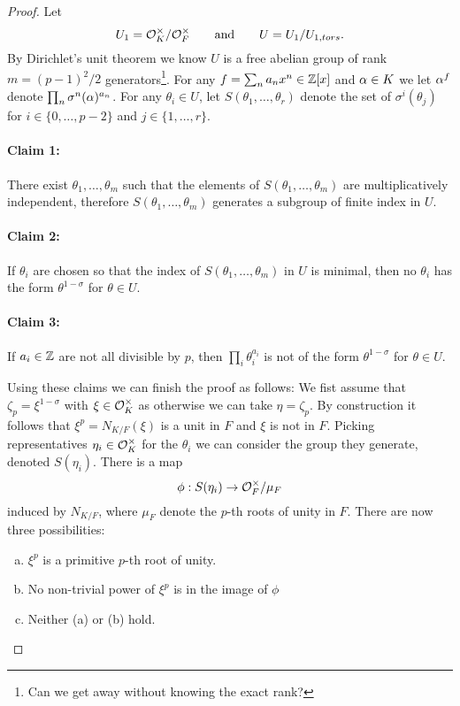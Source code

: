 \begin{proof}
	Let \[U_1= \mathcal{O}_K^\times / \mathcal{O}_F^\times \qquad \text{and} \qquad U=U_1/U_{1,tors}.\] By Dirichlet's unit theorem we know $U$ is a free abelian group of rank $m=(p-1)^2/2$ generators\footnote{ Can we get away without knowing the exact rank?}. For any $f =\sum_n a_n x^n \in \mathbb{Z}[x]$  and $\alpha \in K$ we let $\alpha^f$ denote $\prod_n \sigma^n(\alpha)^{a_n}$. For any $\theta_i \in U$, let $S(\theta_1, \dots,\theta_r)$ denote the set of $\sigma^i(\theta_j)$ for $i \in \{0,\dots,p-2\}$ and $j \in \{1,\dots,r\}$.
	
	\paragraph{\textbf{Claim 1:}} There exist $\theta_1,\dots,\theta_m$ such that  the elements of $S(\theta_1, \dots,\theta_m)$ are multiplicatively independent, therefore $S(\theta_1, \dots,\theta_m)$ generates a subgroup of finite index in $U$.
	
		
	\paragraph{\textbf{Claim 2:}} If $\theta_i$ are chosen so that the index of $S(\theta_1, \dots,\theta_m)$ in $U$ is minimal, then no $\theta_i$ has the form $\theta^{1-\sigma}$ for $\theta \in U$.
	
	
		\paragraph{\textbf{Claim 3:}} If $a_i \in \mathbb{Z}$ are not all divisible by $p$, then $\prod_i \theta_i^{a_i}$ is not of the form $\theta^{1-\sigma}$ for $\theta \in U$.
		
	Using these claims we can finish the proof as follows: We fist assume that $\zeta_p= \xi^{1-\sigma}$ with $\xi \in \mathcal{O}_K^\times$ as otherwise we can take $\eta=\zeta_p$. By construction it follows that $\xi^p=N_{K/F}(\xi)$ is a unit in $F$ and $\xi$ is not in $F$. Picking representatives $\eta_i \in \mathcal{O}_K^\times$ for the $\theta_i$ we can consider the group they generate, denoted $S(\eta_i)$. There is a map \[\phi: S(\eta_i) \to \mathcal{O}_F^\times/\mu_F\] induced by $N_{K/F}$, where $\mu_F$ denote the $p$-th roots of unity in $F$.	There are now three possibilities:
	

	
		
	\begin{enumerate}[(a)]
		\item $\xi^p$ is a primitive $p$-th root of unity.
		\item No non-trivial power of $\xi^p$ is in the image of $\phi$
		\item Neither (a) or (b) hold.
	\end{enumerate} 
	
	

\end{proof}


